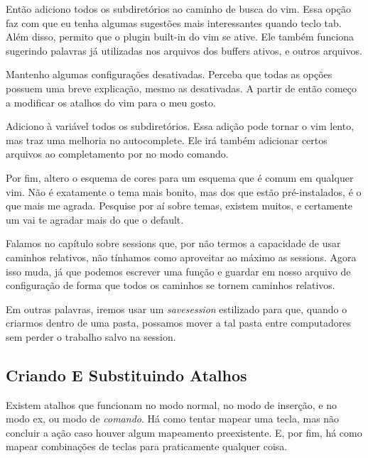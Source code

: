 Então adiciono todos os subdiretórios ao caminho de busca do vim.
Essa opção faz com que eu tenha algumas sugestões mais interessantes quando teclo tab.
Além disso, permito que o plugin built-in do vim se ative.
Ele também funciona sugerindo palavras já utilizadas nos arquivos dos buffers ativos, e outros arquivos.

Mantenho algumas configurações desativadas.
Perceba que todas as opções possuem uma breve explicação, mesmo as desativadas.
A partir de então começo a modificar os atalhos do vim para o meu gosto.

Adiciono à variável  todos os subdiretórios.
Essa adição pode tornar o vim lento, mas traz uma melhoria no autocomplete.
Ele irá também adicionar certos arquivos ao completamento por  no modo comando.

Por fim, altero o esquema de cores para um esquema que é comum em qualquer vim.
Não é exatamente o tema mais bonito, mas dos que estão pré-instalados, é o que mais me agrada.
Pesquise por aí sobre temas, existem muitos, e certamente um vai te agradar mais do que o default.


Falamos no capítulo sobre sessions que, por não termos a capacidade de usar caminhos relativos,
não tínhamos como aproveitar ao máximo as sessions.
Agora isso muda, já que podemos escrever uma função e guardar em
nosso arquivo de configuração de forma que todos os caminhos se tornem
caminhos relativos.

Em outras palavras, iremos usar um \emph{savesession} estilizado para que,
quando o criarmos dentro de uma pasta, possamos mover a tal pasta entre
computadores sem perder o trabalho salvo na session.


\subsection{Criando E Substituindo Atalhos}
Existem atalhos que funcionam no modo normal, no modo de inserção, e no modo ex, ou modo de \emph{comando}.
Há como tentar mapear uma tecla, mas não concluir a ação caso houver algum mapeamento preexistente.
E, por fim, há como mapear combinações de teclas para praticamente qualquer coisa.

